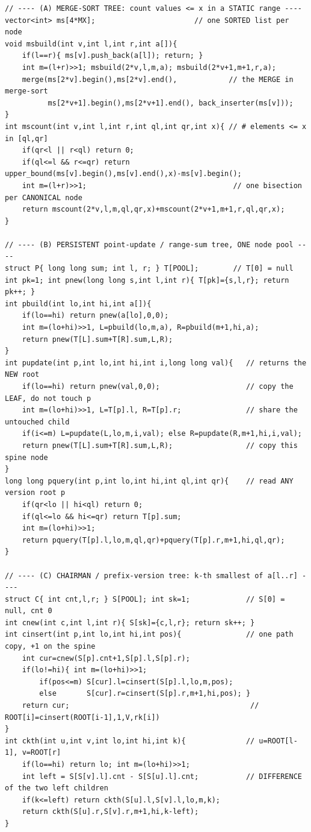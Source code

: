 \begin{lstlisting}[caption={Chapter 21 kit: merge-sort tree (count by value) + persistent point-update/range-sum tree on a node pool + chairman prefix roots (two-root kth) + sparse table, all four in one place}, label={lst:c19-kit}]
// ---- (A) MERGE-SORT TREE: count values <= x in a STATIC range ----
vector<int> ms[4*MX];                       // one SORTED list per node
void msbuild(int v,int l,int r,int a[]){
    if(l==r){ ms[v].push_back(a[l]); return; }
    int m=(l+r)>>1; msbuild(2*v,l,m,a); msbuild(2*v+1,m+1,r,a);
    merge(ms[2*v].begin(),ms[2*v].end(),            // the MERGE in merge-sort
          ms[2*v+1].begin(),ms[2*v+1].end(), back_inserter(ms[v]));
}
int mscount(int v,int l,int r,int ql,int qr,int x){ // # elements <= x in [ql,qr]
    if(qr<l || r<ql) return 0;
    if(ql<=l && r<=qr) return upper_bound(ms[v].begin(),ms[v].end(),x)-ms[v].begin();
    int m=(l+r)>>1;                                  // one bisection per CANONICAL node
    return mscount(2*v,l,m,ql,qr,x)+mscount(2*v+1,m+1,r,ql,qr,x);
}

// ---- (B) PERSISTENT point-update / range-sum tree, ONE node pool ----
struct P{ long long sum; int l, r; } T[POOL];        // T[0] = null
int pk=1; int pnew(long long s,int l,int r){ T[pk]={s,l,r}; return pk++; }
int pbuild(int lo,int hi,int a[]){
    if(lo==hi) return pnew(a[lo],0,0);
    int m=(lo+hi)>>1, L=pbuild(lo,m,a), R=pbuild(m+1,hi,a);
    return pnew(T[L].sum+T[R].sum,L,R);
}
int pupdate(int p,int lo,int hi,int i,long long val){   // returns the NEW root
    if(lo==hi) return pnew(val,0,0);                    // copy the LEAF, do not touch p
    int m=(lo+hi)>>1, L=T[p].l, R=T[p].r;               // share the untouched child
    if(i<=m) L=pupdate(L,lo,m,i,val); else R=pupdate(R,m+1,hi,i,val);
    return pnew(T[L].sum+T[R].sum,L,R);                 // copy this spine node
}
long long pquery(int p,int lo,int hi,int ql,int qr){    // read ANY version root p
    if(qr<lo || hi<ql) return 0;
    if(ql<=lo && hi<=qr) return T[p].sum;
    int m=(lo+hi)>>1;
    return pquery(T[p].l,lo,m,ql,qr)+pquery(T[p].r,m+1,hi,ql,qr);
}

// ---- (C) CHAIRMAN / prefix-version tree: k-th smallest of a[l..r] ----
struct C{ int cnt,l,r; } S[POOL]; int sk=1;             // S[0] = null, cnt 0
int cnew(int c,int l,int r){ S[sk]={c,l,r}; return sk++; }
int cinsert(int p,int lo,int hi,int pos){               // one path copy, +1 on the spine
    int cur=cnew(S[p].cnt+1,S[p].l,S[p].r);
    if(lo!=hi){ int m=(lo+hi)>>1;
        if(pos<=m) S[cur].l=cinsert(S[p].l,lo,m,pos);
        else       S[cur].r=cinsert(S[p].r,m+1,hi,pos); }
    return cur;                                          // ROOT[i]=cinsert(ROOT[i-1],1,V,rk[i])
}
int ckth(int u,int v,int lo,int hi,int k){              // u=ROOT[l-1], v=ROOT[r]
    if(lo==hi) return lo; int m=(lo+hi)>>1;
    int left = S[S[v].l].cnt - S[S[u].l].cnt;           // DIFFERENCE of the two left children
    if(k<=left) return ckth(S[u].l,S[v].l,lo,m,k);
    return ckth(S[u].r,S[v].r,m+1,hi,k-left);
}


\end{lstlisting}
